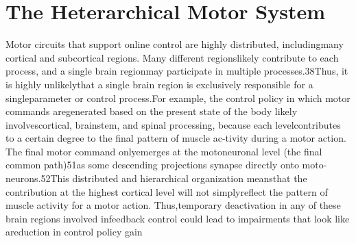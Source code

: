 \documentclass[../main.tex]{subfiles}
\begin{document}



\section{The Heterarchical Motor System}

Motor circuits that support online control are highly distributed, includingmany cortical and subcortical regions. Many different regionslikely contribute to each process, and a single brain regionmay participate in multiple processes.38Thus, it is highly unlikelythat a single brain region is exclusively responsible for a singleparameter or control process.For example, the control policy in which motor commands aregenerated based on the present state of the body likely involvescortical, brainstem, and spinal processing, because each levelcontributes to a certain degree to the final pattern of muscle ac-tivity during a motor action. The final motor command onlyemerges at the motoneuronal level (the final common path)51as some descending projections synapse directly onto moto-neurons.52This distributed and hierarchical organization meansthat the contribution at the highest cortical level will not simplyreflect the pattern of muscle activity for a motor action. Thus,temporary deactivation in any of these brain regions involved infeedback control could lead to impairments that look like areduction in control policy gain
\end{document}
